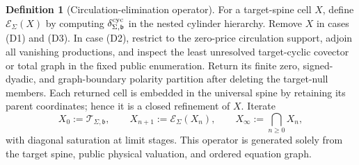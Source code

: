 \documentclass[11pt]{article}
\numberwithin{section}{part}
\theoremstyle{plain}
\theoremstyle{definition}
\newtheorem{definition}[definition]{Definition}
\theoremstyle{remark}
\newcommand{\Spine}{\mathscr T}
\begin{document}
\begin{definition}[Circulation-elimination operator]
\label{def:circulation-elimination-operator}
For a target-spine cell \(X\), define \(\mathcal E_\Sigma(X)\) by computing
\(\delta^{\rm cyc}_{\Sigma,\mathfrak b}\) in the nested cylinder hierarchy.
Remove \(X\) in cases \textup{(D1)} and \textup{(D3)}.  In case
\textup{(D2)}, restrict to the zero-price circulation support, adjoin all
vanishing productions, and inspect the least unresolved target-cyclic
covector or total graph in the fixed public enumeration.  Return its finite
zero, signed-dyadic, and graph-boundary polarity partition after deleting
the target-null members.  Each returned cell is embedded in the universal spine by retaining
its parent coordinates; hence it is a closed refinement of \(X\).  Iterate
\begin{equation}
 \label{eq:circulation-elimination-iteration}
 X_0:=\Spine_{\Sigma,\mathfrak b},
 \qquad
 X_{n+1}:=\mathcal E_\Sigma(X_n),
 \qquad
 X_\infty:=\bigcap_{n\ge0}X_n,
\end{equation}
with diagonal saturation at limit stages.  This operator is generated solely
from the target spine, public physical valuation, and ordered equation graph.
\end{definition}
\end{document}
